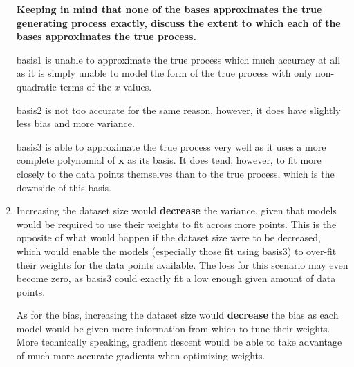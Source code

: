 \documentclass[submit]{harvardml}
\begin{document}
\begin{enumerate}
\textbf{Keeping in mind that none of the bases approximates
the true generating process exactly, discuss the extent to which each of the bases
approximates the true process.}

basis1 is unable to approximate the true process which much accuracy at all as it 
is simply unable to model the form of the true process with only 
non-quadratic terms of the $x$-values.

basis2 is not too accurate for the same reason, however, it does have slightly less bias 
and more variance. 

basis3 is able to approximate the true process very well as it uses a more complete
polynomial of $\textbf{x}$ as its basis. It does tend, however, to fit more closely
to the data points themselves than to the true process, which is the downside of this basis.

\item 
Increasing the dataset size would \textbf{decrease} the variance, given that models
would be required to use their weights to fit across more points. This is the 
opposite of what would happen if the dataset size were to be decreased, which 
would enable the models (especially those fit using basis3) to over-fit their 
weights for the data points available. The loss for this scenario may even become zero,
as basis3 could exactly fit a low enough given amount of data points.

As for the bias, increasing the dataset size would \textbf{decrease} the bias as 
each model would be given more information from which to tune their weights. More
technically speaking, gradient descent would be able to take advantage of much
more accurate gradients when optimizing weights.

\end{enumerate}

\end{document}
